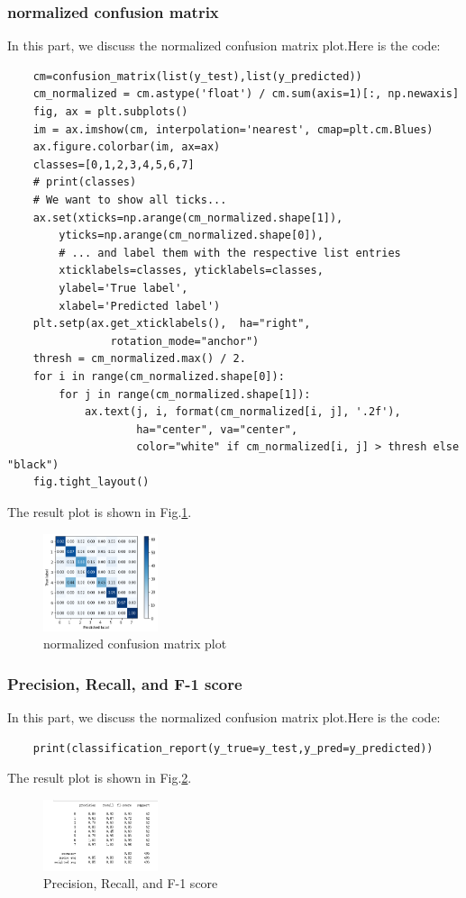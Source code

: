 \documentclass[conference]{IEEEtran}
\begin{document}
\subsubsection{normalized confusion matrix}
In this part, we discuss the normalized confusion matrix plot.Here is the code:
\begin{lstlisting}
    cm=confusion_matrix(list(y_test),list(y_predicted))
    cm_normalized = cm.astype('float') / cm.sum(axis=1)[:, np.newaxis]
    fig, ax = plt.subplots()
    im = ax.imshow(cm, interpolation='nearest', cmap=plt.cm.Blues)
    ax.figure.colorbar(im, ax=ax)
    classes=[0,1,2,3,4,5,6,7]
    # print(classes)
    # We want to show all ticks...
    ax.set(xticks=np.arange(cm_normalized.shape[1]),
        yticks=np.arange(cm_normalized.shape[0]),
        # ... and label them with the respective list entries
        xticklabels=classes, yticklabels=classes,
        ylabel='True label',
        xlabel='Predicted label')
    plt.setp(ax.get_xticklabels(),  ha="right",
                rotation_mode="anchor")
    thresh = cm_normalized.max() / 2.
    for i in range(cm_normalized.shape[0]):
        for j in range(cm_normalized.shape[1]):
            ax.text(j, i, format(cm_normalized[i, j], '.2f'),
                    ha="center", va="center",
                    color="white" if cm_normalized[i, j] > thresh else "black")
    fig.tight_layout()
\end{lstlisting}
The result plot is shown in Fig.\ref{Fig.t3q1c}.
\begin{figure}[h] 
    \centering
    \includegraphics[width=0.3\textwidth]{T3Q1c.png}
    \caption{normalized confusion matrix plot} 
    \label{Fig.t3q1c} 
\end{figure}

\subsubsection{Precision, Recall, and F-1 score}
In this part, we discuss the normalized confusion matrix plot.Here is the code:
\begin{lstlisting}
    print(classification_report(y_true=y_test,y_pred=y_predicted))
\end{lstlisting}
The result plot is shown in Fig.\ref{Fig.t3q1d}.
\begin{figure}[h] 
    \centering
    \includegraphics[width=0.3\textwidth]{T3Q1d.png}
    \caption{Precision, Recall, and F-1 score} 
    \label{Fig.t3q1d} 
\end{figure}
\end{document}

